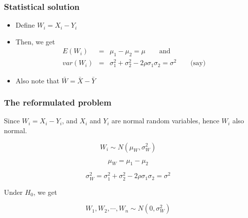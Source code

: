 \documentclass{beamer}\usepackage[]{graphicx}\usepackage[]{color}
\begin{document}
\begin{frame}

\frametitle{Statistical solution}

\begin{itemize}

\item Define $W_i=X_i-Y_i$ 

\item Then, we get 
\begin{align}
E(W_i) &=& \mu_1-\mu_2=\mu \qquad \text{and} \\
var(W_i) &=& \sigma_1^2+\sigma_2^2-2\rho\sigma_1\sigma_2=\sigma^2 \qquad \text{(say)}
\end{align} 

\item Also note that $\bar W = \bar X - \bar Y$

\end{itemize}

\end{frame}

\begin{frame}

\frametitle{The reformulated problem}



\pause
{}




\end{frame}

\begin{frame}

Since $W_{i}=X_{i} - Y_{i}$, and $X_{i}$ and $Y_{i}$ are normal random variables,
hence $W_i$ also normal. \pause

$$ W_i \sim N (\mu_{W}, \sigma^2_{W}) $$ \pause

$$ \mu_{W} = \mu_1 - \mu_2 $$ \pause

$$ \sigma^2_{W} = \sigma_1^2+\sigma_2^2-2\rho\sigma_1\sigma_2=\sigma^2 $$ \pause

Under $H_{0}$, we get 

$$ W_{1}, W_{2}, \cdots, W_{n} \sim N(0, \sigma^2_{W}) $$

\end{frame}
\end{document}
